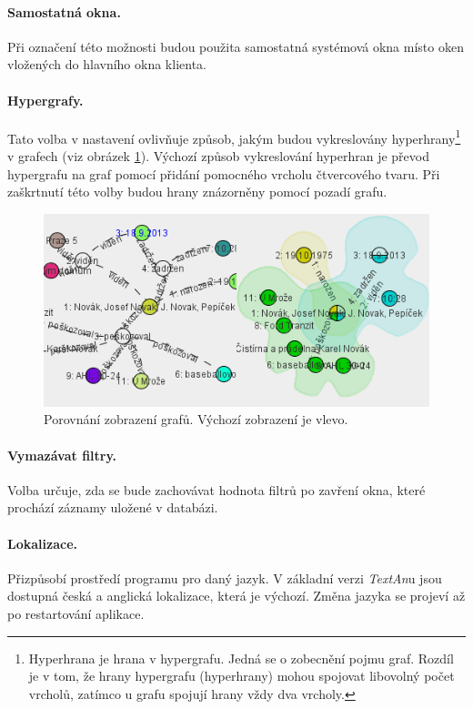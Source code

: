 \documentclass[12pt,a4paper]{report}
\newcommand{\textan}{\emph{TextAn}}
\begin{document}
\paragraph{Samostatná okna.} Při označení této možnosti budou použita samostatná systémová okna místo oken vložených do hlavního okna klienta. 

\paragraph{Hypergrafy.} Tato volba v nastavení ovlivňuje způsob, jakým budou vykreslovány hyperhrany\footnote{Hyperhrana je hrana v hypergrafu. Jedná se o zobecnění pojmu graf. Rozdíl je v tom, že hrany hypergrafu (hyperhrany) mohou spojovat libovolný počet vrcholů, zatímco u grafu spojují hrany vždy dva vrcholy.} v grafech (viz obrázek \ref{fig:Grafy}). Výchozí způsob vykreslování hyperhran je převod hypergrafu na graf pomocí přidání pomocného vrcholu čtvercového tvaru. Při zaškrtnutí této volby budou hrany znázorněny pomocí pozadí grafu.

\begin{figure}[!htb]
	\centering
	\includegraphics[width=\textwidth]{grafy}
	\caption{Porovnání zobrazení grafů. Výchozí zobrazení je vlevo.}
	\label{fig:Grafy}
\end{figure}

\paragraph{Vymazávat filtry.}
Volba určuje, zda se bude zachovávat hodnota filtrů po zavření okna, které prochází záznamy uložené v databázi.

\paragraph{Lokalizace.}
Přizpůsobí prostředí programu pro daný jazyk. V základní verzi \textan u jsou dostupná česká a anglická lokalizace, která je výchozí. Změna jazyka se projeví až po restartování aplikace.
\end{document}
